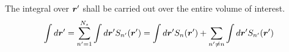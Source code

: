 \documentclass [10pt,letterpaper]{article}
\newcommand{\unitvectorsym}[1]{\hat{\vectorsym{#1}}}
\begin{document}

The integral over $\vectorsym{r}^\prime$ shall be carried out over the entire volume of interest.
\begin{equation} \label{eq:integral-over-rp-decomposition-into-selfterm-plus-interactionterm}
	\begin{split}
		\int d\vectorsym{r}^\prime
		=
		\sum \limits_{n^\prime=1}^{N_s}
		\int d\vectorsym{r}^\prime
		S_{n^\prime}(\vectorsym{r}^\prime)
		=
		\int d\vectorsym{r}^\prime
		S_n(\vectorsym{r}^\prime)
		+
		\sum \limits_{n^\prime \neq n}
		\int d\vectorsym{r}^\prime
		S_{n^\prime}(\vectorsym{r}^\prime)
	\end{split}
\end{equation}
\end{document}
